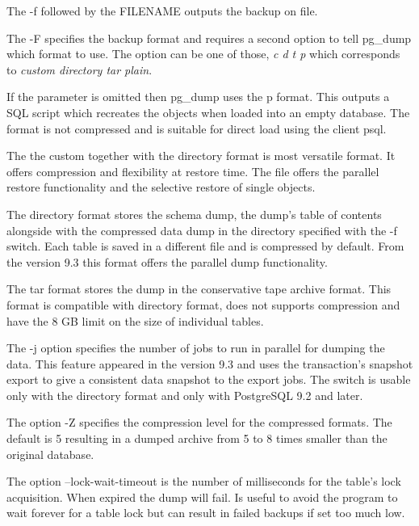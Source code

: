 The -f followed by the FILENAME outputs the backup on file.\newline

The  -F specifies the backup format and requires a second 
option to tell pg\_dump which format to 
use. The option can be one of those, \textit{c d t p} which corresponds to 
\textit{custom directory tar plain}.\newline

If the parameter is omitted then pg\_dump uses the p format. This outputs a SQL script which 
recreates the objects when loaded into an empty database. The format is not compressed and is 
suitable for direct load using the client psql. 

The the custom together with the directory format is most versatile format. It offers compression 
and flexibility at restore time. The file offers the parallel restore functionality and the 
selective restore of single objects.\newline

The directory format stores the schema dump, the dump's table of contents alongside with the 
compressed data dump in the directory specified with the -f switch. Each table is saved in a 
different file and is compressed by default. From the version 9.3 this format offers the parallel 
dump functionality. \newline

The tar format stores the dump in the conservative tape archive format. This format is compatible 
with directory format, does not supports compression and have the 8 GB limit on the size of 
individual tables.\newline

The -j option specifies the number of jobs to run in parallel for dumping the data. This feature 
appeared in the version 9.3 and uses the transaction's snapshot export to give a consistent data 
snapshot to the export jobs. The switch is usable only with the directory format and only 
with PostgreSQL 9.2 and later.\newline 

The option -Z specifies the compression level for the compressed formats. The default is 5 
resulting in a dumped archive from 5 to 8 times smaller than the original database. 

The option --lock-wait-timeout is the number of milliseconds for the table's lock acquisition. 
When expired the dump will fail. Is useful to avoid the program to wait forever for a table lock 
but can result in failed backups if set too much low.


